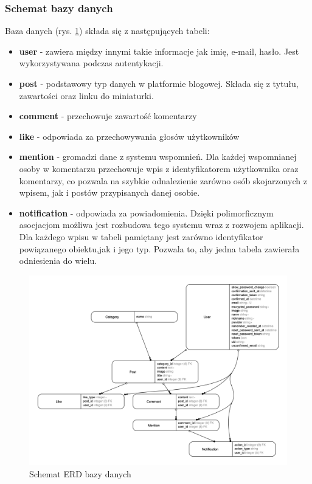 \documentclass[declaration,shortabstract]{iithesis}
\begin{document}
\subsubsection{Schemat bazy danych}
Baza danych (rys. \ref{fig:erd_diagram}) składa się z następujących tabeli: 
\begin{itemize}
    \item \textbf{user} - zawiera między innymi takie informacje jak imię, e-mail, hasło. Jest wykorzystywana podczas autentykacji.
    \item \textbf{post} - podstawowy typ danych w platformie blogowej. Składa się z tytułu, zawartości oraz linku do miniaturki.
    \item \textbf{comment} - przechowuje zawartość komentarzy
    \item \textbf{like} - odpowiada za przechowywania głosów użytkowników
    \item \textbf{mention} - gromadzi dane z systemu wspomnień. Dla każdej wspomnianej osoby w komentarzu przechowuje wpis z identyfikatorem użytkownika oraz komentarzy, co pozwala na szybkie odnalezienie zarówno osób skojarzonych z wpisem, jak i postów przypisanych danej osobie.
    \item \textbf{notification} - odpowiada za powiadomienia. Dzięki polimorficznym asocjacjom możliwa jest rozbudowa tego systemu wraz z rozwojem aplikacji. Dla każdego wpisu w tabeli pamiętany jest zarówno identyfikator powiązanego obiektu,jak i jego typ. Pozwala to, aby jedna tabela zawierała odniesienia do wielu.
\end{itemize}

\begin{figure}
    \centering
    \includegraphics[width=\textwidth]{images/erd.png}
    \caption{Schemat ERD bazy danych}
    \label{fig:erd_diagram}
\end{figure}
\end{document}
